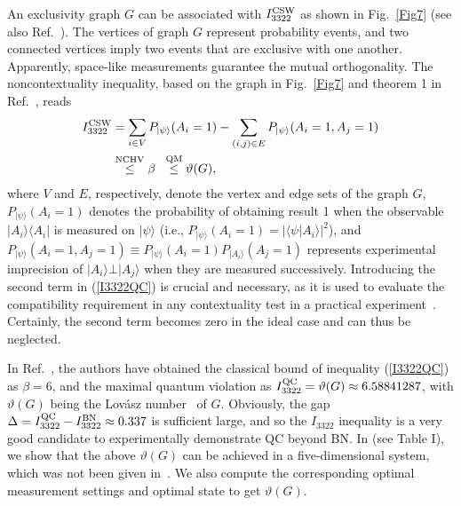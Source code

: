 \documentclass[prl,letterpaper,english,reprint,nofootinbib,aps,superscriptaddress,showpacs,showkeys]{revtex4-1}
\theoremstyle{definition}
\theoremstyle{remark}
\begin{document}
An exclusivity graph $G$ can be associated with $I_{3322}^{\rm CSW}$ as shown in Fig.~\ref{Fig7} (see also Ref.~\cite{RDLTC14}).
The vertices of graph $G$ represent probability events, and two connected vertices imply two events that are exclusive with one another.
 Apparently, space-like measurements guarantee the mutual orthogonality.
The noncontextuality inequality, based on the graph in Fig.~\ref{Fig7} and theorem 1 in Ref.~\cite{cabello16}, reads
\begin{align}
I_{3322}^{\rm CSW}
&=\sum_{i\in V}P_{|\psi\rangle}(A_i=1)-\sum_{(i,j)\in E}P_{|\psi\rangle}(A_i=1,A_j=1)\nonumber\\
&\overset{{\rm{NCHV}}}\leq \beta \;\;\overset{{\rm{QM}}}\leq \vartheta(G),
\label{I3322QC}
\end{align}
where $V$ and $E$, respectively, denote the vertex and edge sets of the graph $G$,
$P_{|\psi\rangle}(A_i=1)$ denotes the probability of obtaining result 1 when the observable $|A_i\rangle\langle A_i|$ is measured on $|\psi\rangle $ (i.e., $P_{|\psi\rangle}(A_i=1)= |\langle \psi|A_i\rangle|^2$), and $P_{|\psi\rangle}(A_i=1,A_j=1)\equiv P_{|\psi\rangle}(A_i=1)P_{|A_i\rangle}(A_j=1)$ represents experimental imprecision of $|A_i\rangle\bot |A_j\rangle$ when they are measured successively.
Introducing the second term in (\ref{I3322QC}) is crucial and necessary, as it is used to evaluate the compatibility requirement in any contextuality test in a practical experiment~\cite{cabello16}. Certainly, the second term becomes zero in the ideal case and can thus be neglected.

In Ref.~\cite{RDLTC14}, the authors have obtained the classical bound of inequality (\ref{I3322QC}) as $\beta=6$, and the maximal quantum violation as $I_{3322}^{\rm QC}=\vartheta(G)\approx 6.58841287$, with $\vartheta(G)$ being the Lov\'asz number~\cite{Lovasz} of $G$. Obviously, the gap $\Delta=I_{3322}^{\rm QC}-I_{3322}^{\rm BN}\approx 0.337$ is sufficient large, and so the $I_{3322}$
inequality is a very good candidate to experimentally demonstrate QC beyond BN.
In \cite{SM} (see Table I), we show that the above $\vartheta(G)$ can be achieved in a five-dimensional system, which was not been given in~\cite{RDLTC14}. We also compute the corresponding optimal measurement settings and optimal state to get $\vartheta(G)$.
\end{document}
